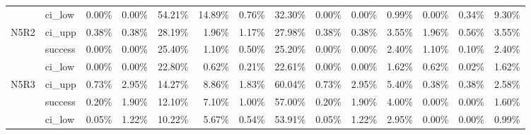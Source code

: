 \begin{tabular}{llrrrrrrrrrrrr}
     & ci\_low &       0.00\% &  0.00\% & 54.21\% & 14.89\% &  0.76\% & 32.30\% &        0.00\% & 0.00\% &  0.99\% & 0.00\% & 0.34\% &  9.30\% \\
N5R2 & ci\_upp &       0.38\% &  0.38\% & 28.19\% &  1.96\% &  1.17\% & 27.98\% &        0.38\% & 0.38\% &  3.55\% & 1.96\% & 0.56\% &  3.55\% \\
     & success &       0.00\% &  0.00\% & 25.40\% &  1.10\% &  0.50\% & 25.20\% &        0.00\% & 0.00\% &  2.40\% & 1.10\% & 0.10\% &  2.40\% \\
     & ci\_low &       0.00\% &  0.00\% & 22.80\% &  0.62\% &  0.21\% & 22.61\% &        0.00\% & 0.00\% &  1.62\% & 0.62\% & 0.02\% &  1.62\% \\
N5R3 & ci\_upp &       0.73\% &  2.95\% & 14.27\% &  8.86\% &  1.83\% & 60.04\% &        0.73\% & 2.95\% &  5.40\% & 0.38\% & 0.38\% &  2.58\% \\
     & success &       0.20\% &  1.90\% & 12.10\% &  7.10\% &  1.00\% & 57.00\% &        0.20\% & 1.90\% &  4.00\% & 0.00\% & 0.00\% &  1.60\% \\
     & ci\_low &       0.05\% &  1.22\% & 10.22\% &  5.67\% &  0.54\% & 53.91\% &        0.05\% & 1.22\% &  2.95\% & 0.00\% & 0.00\% &  0.99\% \\
\bottomrule
\end{tabular}

